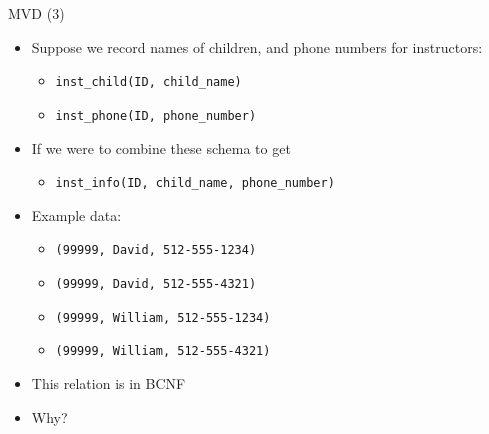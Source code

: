 \documentclass[aspectratio=169, xcolor=dvipsnames]{beamer}
\begin{document}
\begin{frame}{MVD (3)}
    \begin{itemize}[<+->]
        \item Suppose we record names of children, and phone numbers for instructors:
        \begin{itemize}
            \item[$\triangleright$] \texttt{inst\_child(ID, child\_name)}
            \item[$\triangleright$] \texttt{inst\_phone(ID, phone\_number)}
        \end{itemize}
        \item If we were to combine these schema to get
        \begin{itemize}
            \item[$\triangleright$] \texttt{inst\_info(ID, child\_name, phone\_number)}
        \end{itemize}
        \item Example data:
        \begin{itemize}
            \item[$\triangleright$] \texttt{(99999, David, 512-555-1234)}
            \item[$\triangleright$] \texttt{(99999, David, 512-555-4321)}
            \item[$\triangleright$] \texttt{(99999, William, 512-555-1234)}
            \item[$\triangleright$] \texttt{(99999, William, 512-555-4321)}
        \end{itemize}
        \item This relation is in BCNF
        \item Why?
    \end{itemize}
\end{frame}

\end{document}
